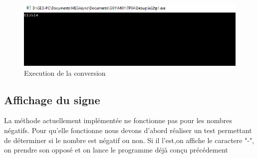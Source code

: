 \documentclass[11pt]{report}
\begin{document}
\begin{figure}[ht]
\includegraphics[width=12cm]{capture8.PNG}
\caption{Execution de la conversion}
\end{figure}

\subsection{Affichage du signe}

La méthode actuellement implémentée ne fonctionne pas pour les nombres négatifs.
Pour qu'elle fonctionne nous devons d'abord réaliser un test permettant de
déterminer si le nombre est négatif ou non.
Si il l'est,on affiche le caractere "-", on prendre son opposé
et on lance le programme déjà conçu précédement
\end{document}

